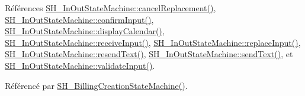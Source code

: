 Références \hyperlink{classSH__InOutStateMachine_a035d37535533d4805fe2606f38c19380}{S\-H\-\_\-\-In\-Out\-State\-Machine\-::cancel\-Replacement()}, \hyperlink{classSH__InOutStateMachine_a7f7d9c9300c1d05bce2c26029f28cc31}{S\-H\-\_\-\-In\-Out\-State\-Machine\-::confirm\-Input()}, \hyperlink{classSH__InOutStateMachine_ab3a12d1f9b658d8ffdc17669a6c065f2}{S\-H\-\_\-\-In\-Out\-State\-Machine\-::display\-Calendar()}, \hyperlink{classSH__InOutStateMachine_a037ed5e13ecfae2123a8d4940292e410}{S\-H\-\_\-\-In\-Out\-State\-Machine\-::receive\-Input()}, \hyperlink{classSH__InOutStateMachine_a9fa5db44086de2576c812f631aa4f60a}{S\-H\-\_\-\-In\-Out\-State\-Machine\-::replace\-Input()}, \hyperlink{classSH__InOutStateMachine_a526822c66b46aa0cd81ba4473fa5573f}{S\-H\-\_\-\-In\-Out\-State\-Machine\-::resend\-Text()}, \hyperlink{classSH__InOutStateMachine_a5e7f5958bae31696b6a8deab94ad2b4f}{S\-H\-\_\-\-In\-Out\-State\-Machine\-::send\-Text()}, et \hyperlink{classSH__InOutStateMachine_aec1b3fef3c1f82499aa1f73beaecd08a}{S\-H\-\_\-\-In\-Out\-State\-Machine\-::validate\-Input()}.



Référencé par \hyperlink{classSH__BillingCreationStateMachine_ad62b77fa4aeafe200056ff3974562f83}{S\-H\-\_\-\-Billing\-Creation\-State\-Machine()}.



